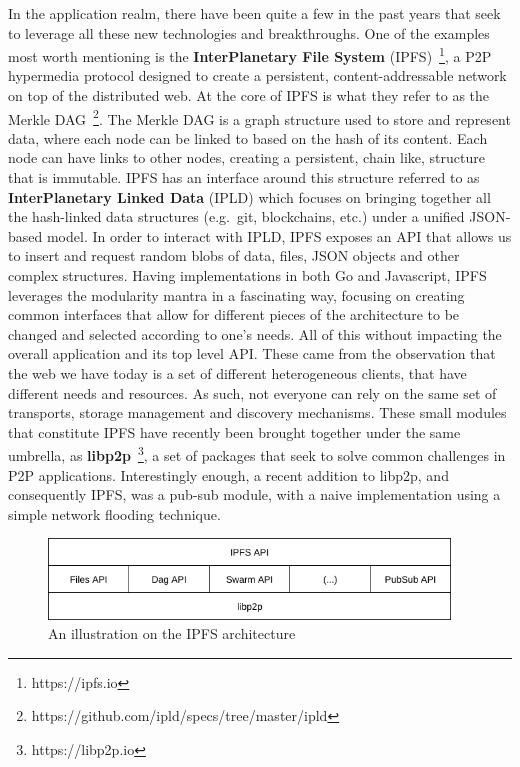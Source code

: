 In the application realm, there have been quite a few in the past years
that seek to leverage all these new technologies and breakthroughs. One
of the examples most worth mentioning is the \textbf{InterPlanetary File
System} (IPFS)~\footnote{https://ipfs.io}, a P2P hypermedia protocol designed
to create a persistent, content-addressable network on top of the
distributed web. At the core of IPFS is what they refer to as the Merkle
DAG~\footnote{https://github.com/ipld/specs/tree/master/ipld}. The Merkle DAG is a
graph structure used to store and represent data, where each node can be
linked to based on the hash of its content. Each node can have links to
other nodes, creating a persistent, chain like, structure that is
immutable. IPFS has an interface around this structure referred to as
\textbf{InterPlanetary Linked Data} (IPLD)
which focuses on bringing together all the hash-linked data structures
(e.g.~git, blockchains, etc.) under a unified JSON-based model. In order
to interact with IPLD, IPFS exposes an API that allows us to insert and
request random blobs of data, files, JSON objects and other complex
structures. Having implementations in both Go and
Javascript, IPFS leverages the modularity mantra in a fascinating way,
focusing on creating common interfaces that allow for different pieces
of the architecture to be changed and selected according to one's needs.
All of this without impacting the overall application and its top level
API. These came from the observation that the web we have today is a set
of different heterogeneous clients, that have different needs and
resources. As such, not everyone can rely on the same set of transports,
storage management and discovery mechanisms. These small modules that
constitute IPFS have recently been brought together under the same
umbrella, as \textbf{libp2p}~\footnote{https://libp2p.io}, a set of
packages that seek to solve common challenges in P2P applications.
Interestingly enough, a recent addition to libp2p, and consequently
IPFS, was a pub-sub module, with a naive implementation using a simple
network flooding technique.

\begin{figure}[hb!]
  \centering
  \includegraphics[width=0.95\textwidth]{img/ipfs-stack.png}
  \caption{An illustration on the IPFS architecture}
  \label{fig:ipfs-stack}
\end{figure}
